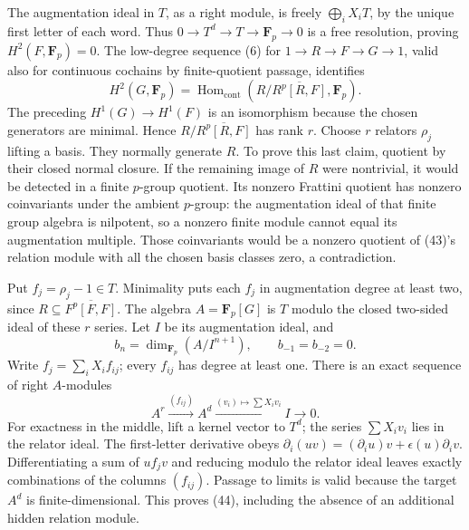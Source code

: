 \documentclass[11pt,a4paper]{article}
\begin{document}
The augmentation ideal in \(T\), as a right module, is freely
\(\bigoplus_i X_iT\), by the unique first letter of each word. Thus
\(0\to T^d\to T\to\mathbf F_p\to0\) is a free resolution, proving
\(H^2(F,\mathbf F_p)=0\). The low-degree sequence (6) for
\(1\to R\to F\to G\to1\), valid also for continuous cochains by
finite-quotient passage, identifies \[
H^2(G,\mathbf F_p)
=\operatorname{Hom}_{\mathrm{cont}}
   (R/\overline{R^p[R,F]},\mathbf F_p).
\tag{43}
\] The preceding \(H^1(G)\to H^1(F)\) is an isomorphism because the
chosen generators are minimal. Hence \(R/\overline{R^p[R,F]}\) has rank
\(r\). Choose \(r\) relators \(\rho_j\) lifting a basis. They normally
generate \(R\). To prove this last claim, quotient by their closed
normal closure. If the remaining image of \(R\) were nontrivial, it
would be detected in a finite \(p\)-group quotient. Its nonzero Frattini
quotient has nonzero coinvariants under the ambient \(p\)-group: the
augmentation ideal of that finite group algebra is nilpotent, so a
nonzero finite module cannot equal its augmentation multiple. Those
coinvariants would be a nonzero quotient of (43)'s relation module with
all the chosen basis classes zero, a contradiction.

Put \(f_j=\rho_j-1\in T\). Minimality puts each \(f_j\) in augmentation
degree at least two, since \(R\subseteq\overline{F^p[F,F]}\). The
algebra \(A=\mathbf F_p[G]\) is \(T\) modulo the closed two-sided ideal
of these \(r\) series. Let \(I\) be its augmentation ideal, and \[
b_n=\dim_{\mathbf F_p}(A/I^{n+1}),\qquad b_{-1}=b_{-2}=0.
\] Write \(f_j=\sum_i X_i f_{ij}\); every \(f_{ij}\) has degree at least
one. There is an exact sequence of right \(A\)-modules \[
A^r\xrightarrow{(f_{ij})}A^d
\xrightarrow{(v_i)\mapsto\sum X_iv_i}I\to0.
\tag{44}
\] For exactness in the middle, lift a kernel vector to \(T^d\); the
series \(\sum X_iv_i\) lies in the relator ideal. The first-letter
derivative obeys
\(\partial_i(uv)=(\partial_i u)v+\epsilon(u)\partial_i v\).
Differentiating a sum of \(u f_j v\) and reducing modulo the relator
ideal leaves exactly combinations of the columns \((f_{ij})\). Passage
to limits is valid because the target \(A^d\) is finite-dimensional.
This proves (44), including the absence of an additional hidden relation
module.
\end{document}
